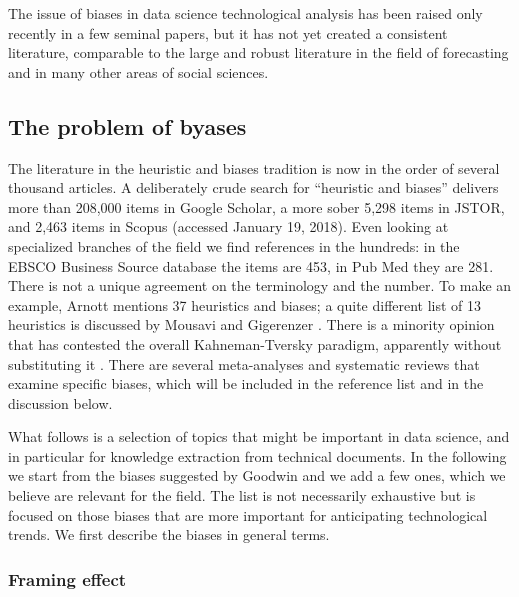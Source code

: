\documentclass[]{book}
\begin{document}
The issue of biases in data science technological analysis has been
raised only recently in a few seminal papers, but it has not yet created
a consistent literature, comparable to the large and robust literature
in the field of forecasting and in many other areas of social sciences.

\subsection{The problem of byases}\label{sotadocumentsunderstandbyas}

The literature in the heuristic and biases tradition is now in the order
of several thousand articles. A deliberately crude search for
``heuristic and biases'' delivers more than 208,000 items in Google
Scholar, a more sober 5,298 items in JSTOR, and 2,463 items in Scopus
(accessed January 19, 2018). Even looking at specialized branches of the
field we find references in the hundreds: in the EBSCO Business Source
database the items are 453, in Pub Med they are 281. There is not a
unique agreement on the terminology and the number. To make an example,
Arnott \citep{arnott1998decision} mentions 37 heuristics and biases; a
quite different list of 13 heuristics is discussed by Mousavi and
Gigerenzer \citep{mousavi2014risk}. There is a minority opinion that has
contested the overall Kahneman-Tversky \citep{kahneman2011thinking}
paradigm, apparently without substituting it \citep{gigerenzer1991make}.
There are several meta-analyses and systematic reviews that examine
specific biases, which will be included in the reference list and in the
discussion below.

What follows is a selection of topics that might be important in data
science, and in particular for knowledge extraction from technical
documents. In the following we start from the biases suggested by
Goodwin \citep{goodwin2015history} and we add a few ones, which we
believe are relevant for the field. The list is not necessarily
exhaustive but is focused on those biases that are more important for
anticipating technological trends. We first describe the biases in
general terms.

\subsubsection*{Framing effect}\label{framing-effect}
\end{document}
